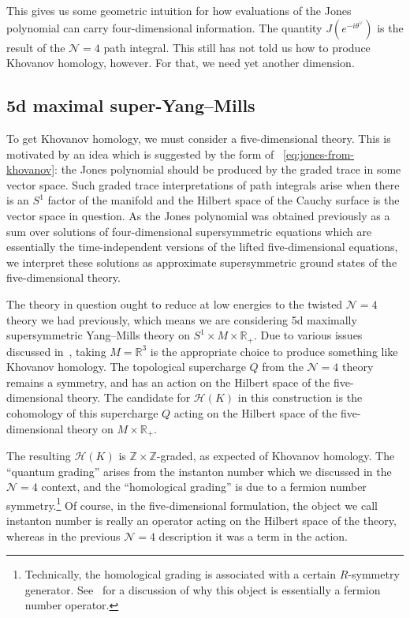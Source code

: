 \documentclass[11pt]{article}
\numberwithin{equation}{section}
\begin{document}
This gives us some geometric intuition for how evaluations of the Jones polynomial can carry four-dimensional information.
The quantity $J(e^{-i\theta^\vee})$ is the result of the $\mathcal{N}=4$ path integral.
This still has not told us how to produce Khovanov homology, however.
For that, we need yet another dimension.

\subsection{5d maximal super-Yang--Mills}
To get Khovanov homology, we must consider a five-dimensional theory.
This is motivated by an idea which is suggested by the form of ~\eqref{eq:jones-from-khovanov}: the Jones polynomial should be produced by the graded trace in some vector space.
Such graded trace interpretations of path integrals arise when there is an $S^1$ factor of the manifold and the Hilbert space of the Cauchy surface is the vector space in question.
As the Jones polynomial was obtained previously as a sum over solutions of four-dimensional supersymmetric equations which are essentially the time-independent versions of the lifted five-dimensional equations, we interpret these solutions as approximate supersymmetric ground states of the five-dimensional theory.

The theory in question ought to reduce at low energies to the twisted $\mathcal{N}=4$ theory we had previously, which means we are considering 5d maximally supersymmetric Yang--Mills theory on $S^1 \times M \times \mathbb{R}_+$.
Due to various issues discussed in~\cite{Witten:2011zz}, taking $M = \mathbb{R}^3$ is the appropriate choice to produce something like Khovanov homology.
The topological supercharge $Q$ from the $\mathcal{N}=4$ theory remains a symmetry, and has an action on the Hilbert space of the five-dimensional theory.
The candidate for $\mathcal{H}(K)$ in this construction is the cohomology of this supercharge $Q$ acting on the Hilbert space of the five-dimensional theory on $M \times \mathbb{R}_+$.

The resulting $\mathcal{H}(K)$ is $\mathbb{Z}\times \mathbb{Z}$-graded, as expected of Khovanov homology.
The ``quantum grading'' arises from the instanton number which we discussed in the $\mathcal{N}=4$ context, and the ``homological grading'' is due to a fermion number symmetry.\footnote{Technically, the homological grading is associated with a certain $R$-symmetry generator.
See~\cite{Witten:2011zz} for a discussion of why this object is essentially a fermion number operator.}
Of course, in the five-dimensional formulation, the object we call instanton number is really an operator acting on the Hilbert space of the theory, whereas in the previous $\mathcal{N}=4$ description it was a term in the action.
\end{document}
